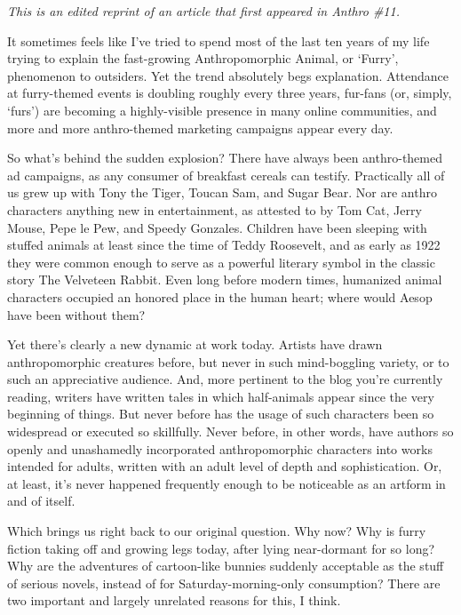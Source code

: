 
\textit{This is an edited reprint of an article that first appeared in Anthro \#11.}

It sometimes feels like I've tried to spend most of the last ten years of my life trying to explain the fast-growing Anthropomorphic Animal, or `Furry', phenomenon to outsiders. Yet the trend absolutely begs explanation. Attendance at furry-themed events is doubling roughly every three years, fur-fans (or, simply, `furs') are becoming a highly-visible presence in many online communities, and more and more anthro-themed marketing campaigns appear every day.

So what's behind the sudden explosion? There have always been anthro-themed ad campaigns, as any consumer of breakfast cereals can testify. Practically all of us grew up with Tony the Tiger, Toucan Sam, and Sugar Bear. Nor are anthro characters anything new in entertainment, as attested to by Tom Cat, Jerry Mouse, Pepe le Pew, and Speedy Gonzales. Children have been sleeping with stuffed animals at least since the time of Teddy Roosevelt, and as early as 1922 they were common enough to serve as a powerful literary symbol in the classic story The Velveteen Rabbit. Even long before modern times, humanized animal characters occupied an honored place in the human heart; where would Aesop have been without them?

Yet there's clearly a new dynamic at work today. Artists have drawn anthropomorphic creatures before, but never in such mind-boggling variety, or to such an appreciative audience. And, more pertinent to the blog you're currently reading, writers have written tales in which half-animals appear since the very beginning of things. But never before has the usage of such characters been so widespread or executed so skillfully. Never before, in other words, have authors so openly and unashamedly incorporated anthropomorphic characters into works intended for adults, written with an adult level of depth and sophistication. Or, at least, it's never happened frequently enough to be noticeable as an artform in and of itself.

Which brings us right back to our original question. Why now? Why is furry fiction taking off and growing legs today, after lying near-dormant for so long? Why are the adventures of cartoon-like bunnies suddenly acceptable as the stuff of serious novels, instead of for Saturday-morning-only consumption? There are two important and largely unrelated reasons for this, I think.

